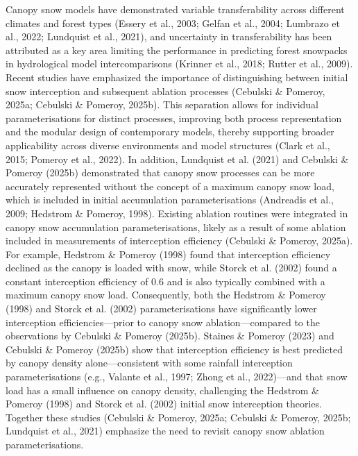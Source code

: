 \documentclass[
]{agujournal2019}
\begin{document}
Canopy snow models have demonstrated variable transferability across
different climates and forest types (Essery et al., 2003; Gelfan et al.,
2004; Lumbrazo et al., 2022; Lundquist et al., 2021), and uncertainty in
transferability has been attributed as a key area limiting the
performance in predicting forest snowpacks in hydrological model
intercomparisons (Krinner et al., 2018; Rutter et al., 2009). Recent
studies have emphasized the importance of distinguishing between initial
snow interception and subsequent ablation processes (Cebulski \&
Pomeroy, 2025a; Cebulski \& Pomeroy, 2025b). This separation allows for
individual parameterisations for distinct processes, improving both
process representation and the modular design of contemporary models,
thereby supporting broader applicability across diverse environments and
model structures (Clark et al., 2015; Pomeroy et al., 2022). In
addition, Lundquist et al. (2021) and Cebulski \& Pomeroy (2025b)
demonstrated that canopy snow processes can be more accurately
represented without the concept of a maximum canopy snow load, which is
included in initial accumulation parameterisations (Andreadis et al.,
2009; Hedstrom \& Pomeroy, 1998). Existing ablation routines were
integrated in canopy snow accumulation parameterisations, likely as a
result of some ablation included in measurements of interception
efficiency (Cebulski \& Pomeroy, 2025a). For example, Hedstrom \&
Pomeroy (1998) found that interception efficiency declined as the canopy
is loaded with snow, while Storck et al. (2002) found a constant
interception efficiency of 0.6 and is also typically combined with a
maximum canopy snow load. Consequently, both the Hedstrom \& Pomeroy
(1998) and Storck et al. (2002) parameterisations have significantly
lower interception efficiencies---prior to canopy snow
ablation---compared to the observations by Cebulski \& Pomeroy (2025b).
Staines \& Pomeroy (2023) and Cebulski \& Pomeroy (2025b) show that
interception efficiency is best predicted by canopy density
alone---consistent with some rainfall interception parameterisations
(e.g., Valante et al., 1997; Zhong et al., 2022)---and that snow load
has a small influence on canopy density, challenging the Hedstrom \&
Pomeroy (1998) and Storck et al. (2002) initial snow interception
theories. Together these studies (Cebulski \& Pomeroy, 2025a; Cebulski
\& Pomeroy, 2025b; Lundquist et al., 2021) emphasize the need to revisit
canopy snow ablation parameterisations.
\end{document}

